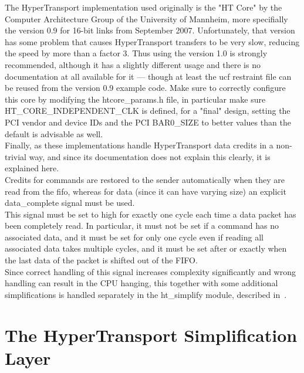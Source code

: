 The HyperTransport implementation used originally is the "HT Core" by the Computer
Architecture Group of the University of Mannheim, more specifially the
version 0.9 for 16-bit links from September 2007.
Unfortunately, that version has some problem that causes HyperTransport
transfers to be very slow, reducing the speed by more than a factor 3.
Thus using the version 1.0 is strongly recommended, although it has
a slightly different usage and there is no documentation at all available
for it --- though at least the ucf restraint file can be reused from
the version 0.9 example code.
Make sure to correctly configure this core by modifying the htcore\_params.h
file, in particular make sure HT\_CORE\_INDEPENDENT\_CLK is defined,
for a "final" design, setting the PCI vendor and device IDs and the
PCI BAR0\_SIZE to better values than the default is advisable as well.\\
Finally, as these implementations handle HyperTransport data credits in a
non-trivial way, and since its documentation does not explain this clearly, it is
explained here.\\
Credits for commands are restored to the sender automatically when they are
read from the fifo, whereas for data (since it can have varying size) an
explicit data\_complete signal must be used.\\
This signal must be set to high for exactly one cycle each time a data packet
has been completely read. In particular, it must not be set if a command
has no associated data, and it must be set for only one cycle even if reading
all associated data takes multiple cycles, and it must be set after or
exactly when the last data of the packet is shifted out of the FIFO.\\
Since correct handling of this signal increases complexity significantly
and wrong handling can result in the CPU hanging, this together with some
additional simplifications is handled separately in the ht\_simplify module,
described in~.

\section{The HyperTransport Simplification Layer}
\label{sec:htsimplify}

